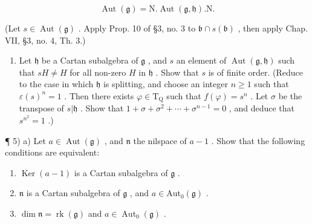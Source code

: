 \[
\operatorname{Aut} (\mathfrak {g}) = \mathrm{N}. \operatorname{Aut} (\mathfrak {g}, \mathfrak {h}). \mathrm{N}.
\]

(Let \(s \in \operatorname{Aut}(\mathfrak{g})\) . Apply Prop. 10 of §3, no. 3 to \(\mathfrak{b} \cap s(\mathfrak{b})\) , then apply Chap. VII, §3, no. 4, Th. 3.)

\begin{enumerate}
\def\labelenumi{\arabic{enumi})}
\setcounter{enumi}{3}
\tightlist
\item
  Let \(\mathfrak{h}\) be a Cartan subalgebra of \(\mathfrak{g}\) , and \(s\) an element of \(\operatorname{Aut}(\mathfrak{g},\mathfrak{h})\) such that \(sH \neq H\) for all non-zero \(H\) in \(\mathfrak{h}\) . Show that \(s\) is of finite order. (Reduce to the case in which \(\mathfrak{h}\) is splitting, and choose an integer \(n \geq 1\) such that \(\varepsilon(s)^n = 1\) . Then there exists \(\varphi \in \mathrm{T}_{\mathrm{Q}}\) such that \(f(\varphi) = s^n\) . Let \(\sigma\) be the transpose of \(s|\mathfrak{h}\) . Show that \(1 + \sigma + \sigma^2 + \cdots + \sigma^{n-1} = 0\) , and deduce that \(s^{n^2} = 1\) .)
\end{enumerate}

¶ 5) a) Let \(a \in \operatorname{Aut}(\mathfrak{g})\) , and \(\mathfrak{n}\) the nilspace of \(a - 1\) . Show that the following conditions are equivalent:

\begin{enumerate}
\def\labelenumi{(\roman{enumi})}
\item
  \(\operatorname{Ker}(a - 1)\) is a Cartan subalgebra of \(\mathfrak{g}\) .
\item
  \(\mathfrak{n}\) is a Cartan subalgebra of \(\mathfrak{g}\) , and \(a\in \mathrm{Aut}_0(\mathfrak{g})\) .
\item
  \(\dim\mathfrak{n}=\operatorname{rk}(\mathfrak{g})\) and \(a\in\operatorname{Aut}_{0}(\mathfrak{g})\) .
\end{enumerate}

